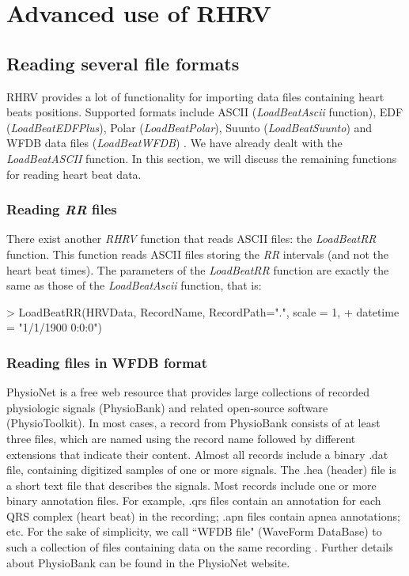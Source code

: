 \chapter{Advanced use of  RHRV\label{ch:RHRV}}

\section{Reading several file formats\label{sec:fileFormats}}
 RHRV provides a lot of functionality for importing data files containing heart 
beats positions. Supported formats include ASCII (\textit{LoadBeatAscii} 
function), EDF (\textit{LoadBeatEDFPlus}), Polar (\textit{LoadBeatPolar}), 
Suunto (\textit{LoadBeatSuunto}) and WFDB data files (\textit{LoadBeatWFDB}) 
\cite{mitbih}. We have already dealt with the \textit{LoadBeatASCII} function. 
In this section, we will discuss the remaining functions for reading heart beat 
data.

\subsection{Reading \textit{RR} files} There exist another \textit{RHRV} 
function that reads ASCII files:  the \textit{LoadBeatRR} function. This 
function reads ASCII files storing the \textit{RR} intervals (and not the heart 
beat times). The parameters of the \textit{LoadBeatRR} function are exactly the 
same as those of the \textit{LoadBeatAscii} function, that is:
\begin{Schunk}
\begin{Sinput}
> LoadBeatRR(HRVData, RecordName, RecordPath=".", scale = 1, 
+       datetime = "1/1/1900 0:0:0")
\end{Sinput}
\end{Schunk}
\subsection{Reading files in WFDB format} PhysioNet \cite{PhysioNet} is a free 
web resource that provides large collections of recorded physiologic signals 
(PhysioBank) and related open-source software (PhysioToolkit). In most cases, a 
record from PhysioBank consists of at least three files, which are named using 
the record name followed by different extensions that indicate their content. 
Almost all records include a binary .dat  file, containing digitized samples of 
one or more signals. The .hea (header) file is a short text file that describes 
the signals. Most records include one or more binary annotation files. For 
example, .qrs files contain an annotation for each QRS complex (heart beat) in 
the recording; .apn files contain apnea annotations; etc. For the sake of 
simplicity, we call ``WFDB file" (WaveForm DataBase) to such a collection of 
files containing data on the same recording \cite{mitbih}. Further details 
about PhysioBank can be found in the PhysioNet website. \\

